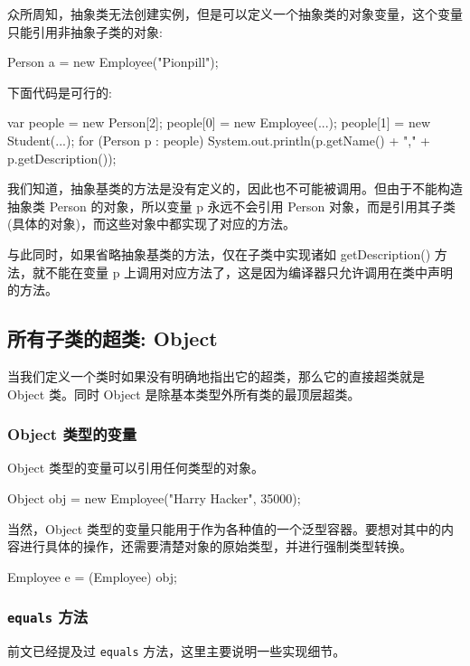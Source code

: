 众所周知，抽象类无法创建实例，但是可以定义一个抽象类的对象变量，这个变量只能引用非抽象子类的对象:
\begin{Java}
Person a = new Employee("Pionpill");
\end{Java}

下面代码是可行的:
\begin{Java}
var people = new Person[2];
people[0] = new Employee(...);
people[1] = new Student(...);
for (Person p : people)
    System.out.println(p.getName() + "," + p.getDescription());
\end{Java}

我们知道，抽象基类的方法是没有定义的，因此也不可能被调用。但由于不能构造抽象类 Person 的对象，所以变量 p 永远不会引用 Person 对象，而是引用其子类(具体的对象)，而这些对象中都实现了对应的方法。

与此同时，如果省略抽象基类的方法，仅在子类中实现诸如 getDescription() 方法，就不能在变量 p 上调用对应方法了，这是因为编译器只允许调用在类中声明的方法。

\subsection{所有子类的超类: Object}

当我们定义一个类时如果没有明确地指出它的超类，那么它的直接超类就是 Object 类。同时 Object 是除基本类型外所有类的最顶层超类。

\subsubsection{Object 类型的变量}

Object 类型的变量可以引用任何类型的对象。

\begin{Java}
Object obj = new Employee("Harry Hacker", 35000);
\end{Java}

当然，Object 类型的变量只能用于作为各种值的一个泛型容器。要想对其中的内容进行具体的操作，还需要清楚对象的原始类型，并进行强制类型转换。

\begin{Java}
Employee e = (Employee) obj;
\end{Java}

\subsubsection{\texttt{equals} 方法}

前文已经提及过 \texttt{equals} 方法，这里主要说明一些实现细节。

